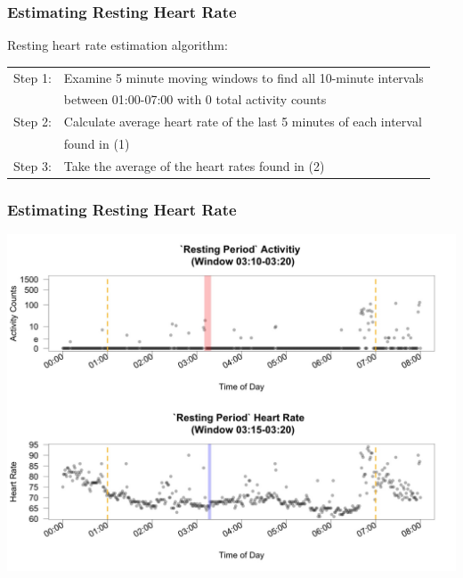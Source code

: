 \documentclass[10pt]{beamer}\usepackage[]{graphicx}\usepackage[]{color}
\begin{document}
\begin{frame}\frametitle{Estimating Resting Heart Rate}

Resting heart rate estimation algorithm: 

\begin{center}
\small
\begin{tabular}{ll} \hline \hline
Step 1:& Examine 5 minute moving windows to find all 10-minute intervals \\
       & between 01:00-07:00 with 0 total activity counts  \\ \hline
Step 2:& Calculate average heart rate of the last 5 minutes of each interval   \\ 
       & found in (1) \\ \hline
Step 3:& Take the average of the heart rates found in (2) \\ \hline \hline
\end{tabular}
\end{center}


\end{frame}



\begin{frame}\frametitle{Estimating Resting Heart Rate}
\begin{center}
\includegraphics[scale=0.15]{RestingHeartRate_P3.jpeg}
\end{center}
\end{frame}
\end{document}
